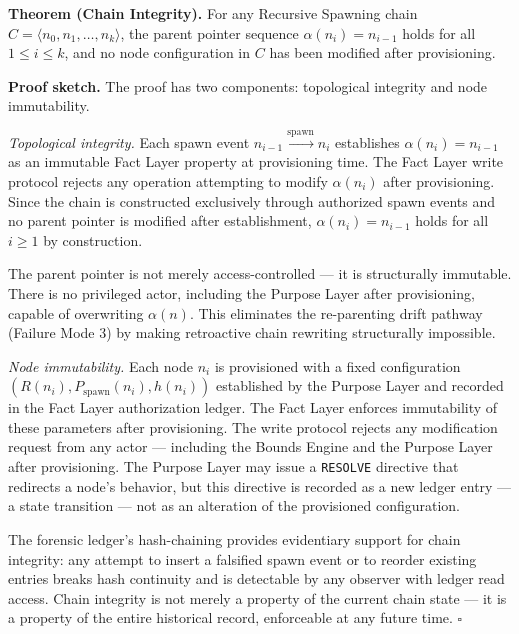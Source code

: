 \medskip
\noindent\textbf{Theorem (Chain Integrity).} For any Recursive Spawning chain $C = \langle n_0, n_1, \ldots, n_k \rangle$, the parent pointer sequence $\alpha(n_i) = n_{i-1}$ holds for all $1 \leq i \leq k$, and no node configuration in $C$ has been modified after provisioning.

\medskip
\noindent\textbf{Proof sketch.} The proof has two components: topological integrity and node immutability.

\medskip
\textit{Topological integrity.} Each spawn event $n_{i-1} \xrightarrow{\mathrm{spawn}} n_i$ establishes $\alpha(n_i) = n_{i-1}$ as an immutable Fact Layer property at provisioning time. The Fact Layer write protocol rejects any operation attempting to modify $\alpha(n_i)$ after provisioning. Since the chain is constructed exclusively through authorized spawn events and no parent pointer is modified after establishment, $\alpha(n_i) = n_{i-1}$ holds for all $i \geq 1$ by construction.

The parent pointer is not merely access-controlled — it is structurally immutable. There is no privileged actor, including the Purpose Layer after provisioning, capable of overwriting $\alpha(n)$. This eliminates the re-parenting drift pathway (Failure Mode 3) by making retroactive chain rewriting structurally impossible.

\medskip
\textit{Node immutability.} Each node $n_i$ is provisioned with a fixed configuration $(R(n_i), P_{\mathrm{spawn}}(n_i), h(n_i))$ established by the Purpose Layer and recorded in the Fact Layer authorization ledger. The Fact Layer enforces immutability of these parameters after provisioning. The write protocol rejects any modification request from any actor — including the Bounds Engine and the Purpose Layer after provisioning. The Purpose Layer may issue a \texttt{RESOLVE} directive that redirects a node's behavior, but this directive is recorded as a new ledger entry — a state transition — not as an alteration of the provisioned configuration.

The forensic ledger's hash-chaining provides evidentiary support for chain integrity: any attempt to insert a falsified spawn event or to reorder existing entries breaks hash continuity and is detectable by any observer with ledger read access. Chain integrity is not merely a property of the current chain state — it is a property of the entire historical record, enforceable at any future time. $\square$

